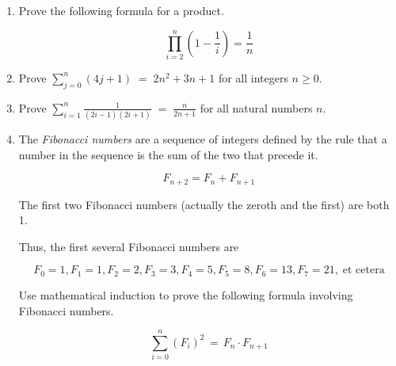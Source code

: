 \begin{enumerate}
\item Prove the following formula for a product.

\[ \prod_{i=2}^n \left(1 - \frac{1}{i}\right) =  \frac{1}{n} \]

\item Prove $\displaystyle \sum_{j=0}^{n}(4j+1) \; = \; 2n^{2}+3n+1$ for all
integers $n \geq 0$.

\item Prove $\displaystyle \sum_{i=1}^{n}\frac{1}{(2i-1)(2i+1)} \; = \; \frac{n}{2n+1}$ for all natural numbers $n$.

\item The  \emph{Fibonacci numbers} are a sequence of integers defined by
the rule that a number in the sequence is the sum of the two that 
precede it.

\[ F_{n+2} = F_n + F_{n+1}  \]

\noindent The first two Fibonacci numbers (actually the zeroth and the first) 
are both 1.  

\noindent Thus, the first several Fibonacci numbers are

\[ F_0 = 1, F_1=1, F_2=2, F_3=3, F_4=5, F_5=8, F_6=13, F_7=21, \; \mbox{et cetera} \]

Use mathematical induction to prove the following formula involving
Fibonacci numbers.

\[ \sum_{i=0}^n (F_i)^2 \, = \, F_n \cdot F_{n+1} \]

\end{enumerate}


